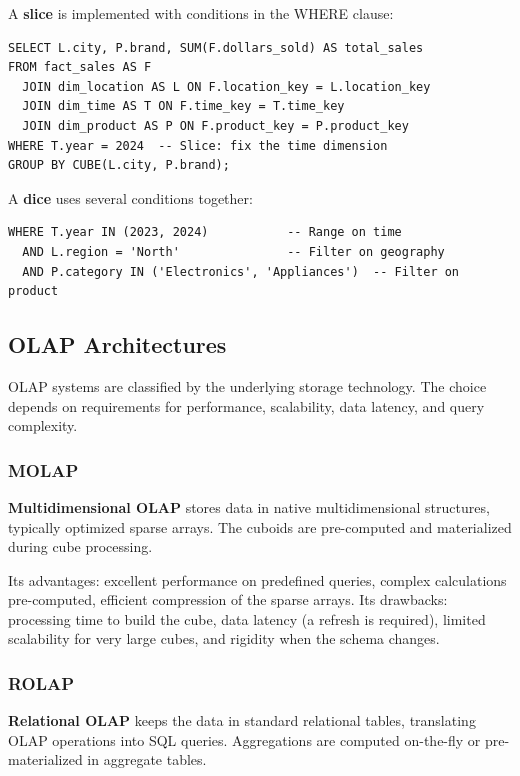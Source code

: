 A \textbf{slice} is implemented with conditions in the WHERE clause:

\begin{lstlisting}
SELECT L.city, P.brand, SUM(F.dollars_sold) AS total_sales
FROM fact_sales AS F
  JOIN dim_location AS L ON F.location_key = L.location_key
  JOIN dim_time AS T ON F.time_key = T.time_key
  JOIN dim_product AS P ON F.product_key = P.product_key
WHERE T.year = 2024  -- Slice: fix the time dimension
GROUP BY CUBE(L.city, P.brand);
\end{lstlisting}

A \textbf{dice} uses several conditions together:

\begin{lstlisting}
WHERE T.year IN (2023, 2024)           -- Range on time
  AND L.region = 'North'               -- Filter on geography
  AND P.category IN ('Electronics', 'Appliances')  -- Filter on product
\end{lstlisting}

\subsection{OLAP Architectures}
\label{sec:olap-architectures}

OLAP systems are classified by the underlying storage technology. The choice depends on requirements for performance, scalability, data latency, and query complexity.

\subsubsection{MOLAP}
\label{subsec:molap}

\textbf{Multidimensional OLAP} stores data in native multidimensional structures, typically optimized sparse arrays. The cuboids are pre-computed and materialized during cube processing.

Its advantages: excellent performance on predefined queries, complex calculations pre-computed, efficient compression of the sparse arrays. Its drawbacks: processing time to build the cube, data latency (a refresh is required), limited scalability for very large cubes, and rigidity when the schema changes.

\subsubsection{ROLAP}
\label{subsec:rolap}

\textbf{Relational OLAP} keeps the data in standard relational tables, translating OLAP operations into SQL queries. Aggregations are computed on-the-fly or pre-materialized in aggregate tables.

